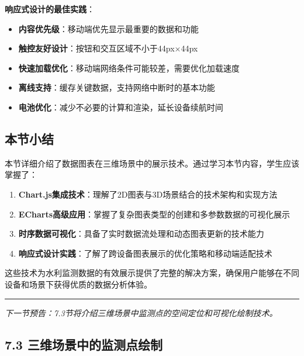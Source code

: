 \begin{Shaded}
\begin{Highlighting}[]
        \OperatorTok{;}
\NormalTok{    \}}
\NormalTok{\}}
\end{Highlighting}
\end{Shaded}

\textbf{响应式设计的最佳实践}：

\begin{itemize}
\tightlist
\item
  \textbf{内容优先级}：移动端优先显示最重要的数据和功能
\item
  \textbf{触控友好设计}：按钮和交互区域不小于44px×44px
\item
  \textbf{快速加载优化}：移动端网络条件可能较差，需要优化加载速度
\item
  \textbf{离线支持}：缓存关键数据，支持网络中断时的基本功能
\item
  \textbf{电池优化}：减少不必要的计算和渲染，延长设备续航时间
\end{itemize}

\subsection{本节小结}\label{ux672cux8282ux5c0fux7ed3-1}

本节详细介绍了数据图表在三维场景中的展示技术。通过学习本节内容，学生应该掌握了：

\begin{enumerate}
\def\labelenumi{\arabic{enumi}.}
\tightlist
\item
  \textbf{Chart.js集成技术}：理解了2D图表与3D场景结合的技术架构和实现方法
\item
  \textbf{ECharts高级应用}：掌握了复杂图表类型的创建和多参数数据的可视化展示
\item
  \textbf{时序数据可视化}：具备了实时数据流处理和动态图表更新的技术能力
\item
  \textbf{响应式设计实践}：了解了跨设备图表展示的优化策略和移动端适配技术
\end{enumerate}

这些技术为水利监测数据的有效展示提供了完整的解决方案，确保用户能够在不同设备和场景下获得优质的数据分析体验。

\begin{center}\rule{0.5\linewidth}{0.5pt}\end{center}

\emph{下一节预告：7.3节将介绍三维场景中监测点的空间定位和可视化绘制技术。}

\subsection{7.3 三维场景中的监测点绘制}\label{ux4e09ux7ef4ux573aux666fux4e2dux7684ux76d1ux6d4bux70b9ux7ed8ux5236}

